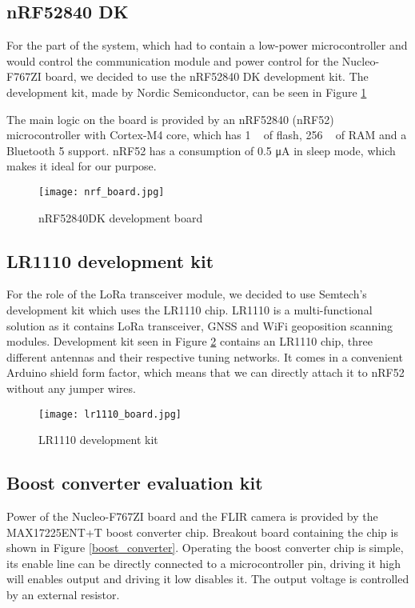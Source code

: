 \subsection{ nRF52840 DK}

For the part of the system, which had to contain a low-power microcontroller and would control the communication module and power control for the Nucleo-F767ZI board, we decided to use the nRF52840 DK development kit.
The development kit, made by Nordic Semiconductor, can be seen in Figure \ref{nrf_board}

The main logic on the board is provided by an nRF52840 (nRF52) microcontroller with Cortex-M4 core, which has 1 \si{\mega\byte} of flash, 256 \si{\kilo\byte} of RAM and a Bluetooth 5 support.
nRF52 has a consumption of 0.5 \si{\micro\ampere} in sleep mode, which makes it ideal for our purpose.

\begin{figure}[ht]
        \centering
        \texttt{[image: nrf\_board.jpg]} 
        \caption{ nRF52840DK development board}
        \label{nrf_board}
\end{figure}

\subsection{ LR1110 development kit}

For the role of the LoRa transceiver module, we decided to use Semtech's development kit which uses the LR1110 chip.
LR1110 is a multi-functional solution as it contains LoRa transceiver, GNSS and WiFi geoposition scanning modules.
Development kit seen in Figure \ref{lr1110_board} contains an LR1110 chip, three different antennas and their respective tuning networks.
It comes in a convenient Arduino shield form factor, which means that we can directly attach it to nRF52 without any jumper wires.

\begin{figure}[ht]
        \centering
        \texttt{[image: lr1110\_board.jpg]} 
        \caption{ LR1110 development kit}
        \label{lr1110_board}
\end{figure}

\subsection{ Boost converter evaluation kit}

Power of the Nucleo-F767ZI board and the FLIR camera is provided by the MAX17225ENT+T boost converter chip.
Breakout board containing the chip is shown in Figure \ref{boost_converter}.
Operating the boost converter chip is simple, its enable line can be directly connected to a microcontroller pin, driving it high will enables output and driving it low disables it.
The output voltage is controlled by an external resistor.

